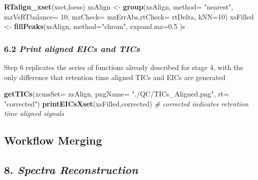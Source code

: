\documentclass[
]{article}
\newenvironment{Shaded}{\begin{snugshade}}{\end{snugshade}}
\newcommand{\CommentTok}[1]{\textcolor[rgb]{0.56,0.35,0.01}{\textit{#1}}}
\newcommand{\DataTypeTok}[1]{\textcolor[rgb]{0.13,0.29,0.53}{#1}}
\newcommand{\DecValTok}[1]{\textcolor[rgb]{0.00,0.00,0.81}{#1}}
\newcommand{\FloatTok}[1]{\textcolor[rgb]{0.00,0.00,0.81}{#1}}
\newcommand{\KeywordTok}[1]{\textcolor[rgb]{0.13,0.29,0.53}{\textbf{#1}}}
\newcommand{\NormalTok}[1]{#1}
\newcommand{\StringTok}[1]{\textcolor[rgb]{0.31,0.60,0.02}{#1}}
\begin{document}
\begin{Shaded}
\begin{Highlighting}[]
\KeywordTok{RTalign\_xset}\NormalTok{(xset,}\StringTok{\textquotesingle{}loess\textquotesingle{}}\NormalTok{)}
\NormalTok{xsAlign <{-}}\StringTok{ }\KeywordTok{group}\NormalTok{(xsAlign, }\DataTypeTok{method=} \StringTok{"nearest"}\NormalTok{, }\DataTypeTok{mzVsRTbalance=} \DecValTok{10}\NormalTok{, }\DataTypeTok{mzCheck=} 
\NormalTok{        mzErrAbs,}\DataTypeTok{rtCheck=}\NormalTok{ rtDelta, }\DataTypeTok{kNN=}\DecValTok{10}\NormalTok{)}
\NormalTok{xsFilled <{-}}\StringTok{ }\KeywordTok{fillPeaks}\NormalTok{(xsAlign, }\DataTypeTok{method=}\StringTok{"chrom"}\NormalTok{, }\DataTypeTok{expand.mz=}\FloatTok{0.5}\NormalTok{ )s}
\end{Highlighting}
\end{Shaded}

\hypertarget{print-aligned-eics-and-tics-1}{%
\subsubsection{\texorpdfstring{6.2 \emph{Print aligned EICs and
TICs}}{6.2 Print aligned EICs and TICs}}\label{print-aligned-eics-and-tics-1}}

Step 6 replicates the series of functions already described for stage 4,
with the only difference that retention time aligned TICs and EICs are
generated

\begin{Shaded}
\begin{Highlighting}[]
\KeywordTok{getTICs}\NormalTok{(}\DataTypeTok{xcmsSet=}\NormalTok{ xsAlign, }\DataTypeTok{pngName=} \StringTok{"./QC/TICs\_Aligned.png"}\NormalTok{, }\DataTypeTok{rt=} \StringTok{"corrected"}\NormalTok{)}
\KeywordTok{printEICsXset}\NormalTok{(xsFilled,}\StringTok{\textquotesingle{}corrected\textquotesingle{}}\NormalTok{)}
\CommentTok{\# \textquotesingle{}corrected\textquotesingle{} indicates retention time aligned signals}
\end{Highlighting}
\end{Shaded}

\hypertarget{workflow-merging}{%
\subsection{\texorpdfstring{\textbf{Workflow
Merging}}{Workflow Merging}}\label{workflow-merging}}

\hypertarget{spectra-reconstruction}{%
\subsection{\texorpdfstring{8. \emph{Spectra
Reconstruction}}{8. Spectra Reconstruction}}\label{spectra-reconstruction}}
\end{document}
